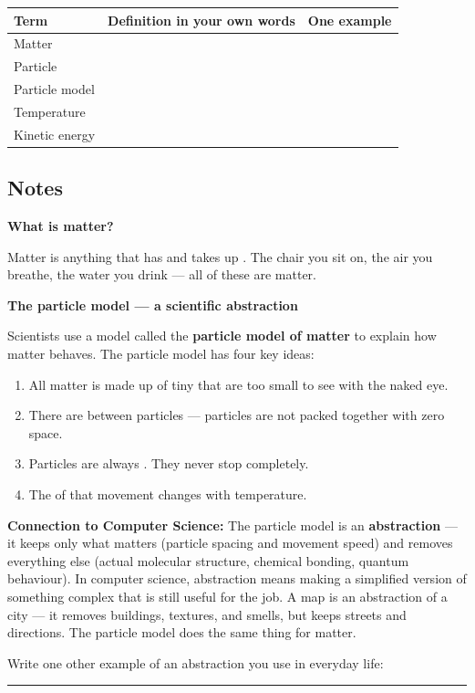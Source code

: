 \documentclass[11pt, a4paper]{article}
\newcommand{\blank}[1]{\underline{\hspace{#1}}}
\newcommand{\answerline}{\par\vspace{0.45cm}\noindent\rule{\linewidth}{0.4pt}\par\vspace{0.1cm}}
\begin{document}
\begin{tabularx}{\linewidth}{|l|X|X|}
\hline
\rowcolor{accentlight}
\textbf{Term} & \textbf{Definition in your own words} & \textbf{One example} \\
\hline
Matter & & \\[16pt]
\hline
Particle & & \\[16pt]
\hline
Particle model & & \\[16pt]
\hline
Temperature & & \\[16pt]
\hline
Kinetic energy & & \\[16pt]
\hline
\end{tabularx}

\subsection{Notes}

\textbf{What is matter?}

Matter is anything that has \blank{2.5cm} and takes up \blank{2.5cm}. The chair you sit on, the air you breathe, the water you drink --- all of these are matter.

\medskip
\textbf{The particle model --- a scientific abstraction}

Scientists use a model called the \textbf{particle model of matter} to explain how matter behaves. The particle model has four key ideas:

\begin{enumerate}
  \item All matter is made up of tiny \blank{3cm} that are too small to see with the naked eye.
  \item There are \blank{3cm} between particles --- particles are not packed together with zero space.
  \item Particles are always \blank{3cm}. They never stop completely.
  \item The \blank{3.5cm} of that movement changes with temperature.
\end{enumerate}

\begin{tcolorbox}[connection]
\small\textbf{Connection to Computer Science:} The particle model is an \textbf{abstraction} --- it keeps only what matters (particle spacing and movement speed) and removes everything else (actual molecular structure, chemical bonding, quantum behaviour). In computer science, abstraction means making a simplified version of something complex that is still useful for the job. A map is an abstraction of a city --- it removes buildings, textures, and smells, but keeps streets and directions. The particle model does the same thing for matter.

\medskip
Write one other example of an abstraction you use in everyday life:
\answerline
\end{tcolorbox}
\end{document}
